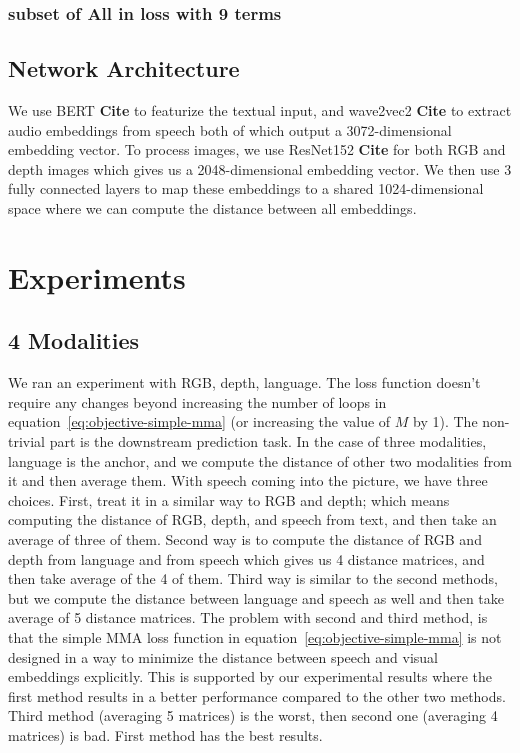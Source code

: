 \documentclass[11pt]{article}
\newcommand{\CitationNeeded}[1]{{\textbf {\color{red}Cite #1}}}
\begin{document}
\subsubsection{subset of All in loss with 9 terms}






\subsection{Network Architecture}
\label{sec:Model}

We use BERT \CitationNeeded{} to featurize the textual input, and wave2vec2 \CitationNeeded{} to extract audio embeddings from speech both of which output a 3072-dimensional embedding vector.
To process images, we use ResNet152 \CitationNeeded{} for both RGB and depth images which gives us a 2048-dimensional embedding vector.
We then use 3 fully connected layers to map these embeddings to a shared 1024-dimensional space where we can compute the distance between all embeddings.









\section{Experiments}
\label{sec:Experiments}

\subsection{4 Modalities}
We ran an experiment with RGB, depth, language. The loss function doesn't require any changes beyond increasing the number of loops in equation~\ref{eq:objective-simple-mma} (or increasing the value of $M$ by 1).
The non-trivial part is the downstream prediction task. In the case of three modalities, language is the anchor, and we compute the distance of other two modalities from it and then average them.
With speech coming into the picture, we have three choices.
First, treat it in a similar way to RGB and depth; which means computing the distance of RGB, depth, and speech from text, and then take an average of three of them.
Second way is to compute the distance of RGB and depth from language and from speech which gives us 4 distance matrices, and then take average of the 4 of them.
Third way is similar to the second methods, but we compute the distance between language and speech as well and then take average of 5 distance matrices.
The problem with second and third method, is that the simple MMA loss function in equation~\ref{eq:objective-simple-mma} is not designed in a way to minimize the distance between speech and visual embeddings explicitly. This is supported by our experimental results where the first method results in a better performance compared to the other two methods.
Third method (averaging 5 matrices) is the worst, then second one (averaging 4 matrices) is bad. First method has the best results.
\end{document}
